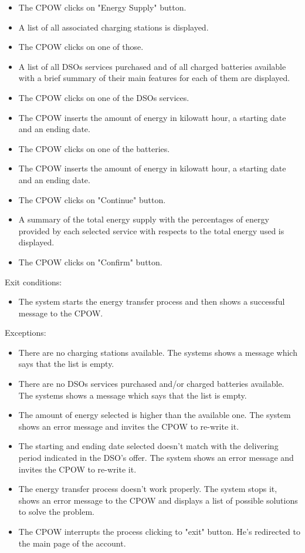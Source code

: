 \documentclass[a4paper]{report}
\begin{document}
\begin{itemize}
\item The CPOW clicks on "Energy Supply" button.
\item A list of all associated charging stations is displayed.
\item The CPOW clicks on one of those.
\item A list of all DSOs services purchased and of all charged batteries available with a brief summary of their main features for each of them are displayed.
\item The CPOW clicks on one of the DSOs services.
\item The CPOW inserts the amount of energy in kilowatt hour, a starting date and an ending date.
\item The CPOW clicks on one of the batteries.
\item The CPOW inserts the amount of energy in kilowatt hour, a starting date and an ending date.
\item The CPOW clicks on "Continue" button.
\item A summary of the total energy supply with the percentages of energy provided by each selected service with respects to the total energy used is displayed.
\item The CPOW clicks on "Confirm" button.
\end{itemize}
Exit conditions: 
\begin{itemize}
\item The system starts the energy transfer process and then shows a successful message to the CPOW.
\end{itemize} 
Exceptions: 
\begin{itemize}
\item There are no charging stations available. The systems shows a message which says that the list is empty.
\item There are no DSOs services purchased and/or charged batteries available. The systems shows a message which says that the list is empty.
\item The amount of energy selected is higher than the available one. The system shows an error message and invites the CPOW to re-write it.
\item The starting and ending date selected doesn't match with the delivering period indicated in the DSO's offer. The system shows an error message and invites the CPOW to re-write it.
\item The energy transfer process doesn't work properly. The system stops it, shows an error message to the CPOW and displays a list of possible solutions to solve the problem.
\item The CPOW interrupts the process clicking to "exit" button. He's redirected to the main page of the account.
\end{itemize}
\end{document}

